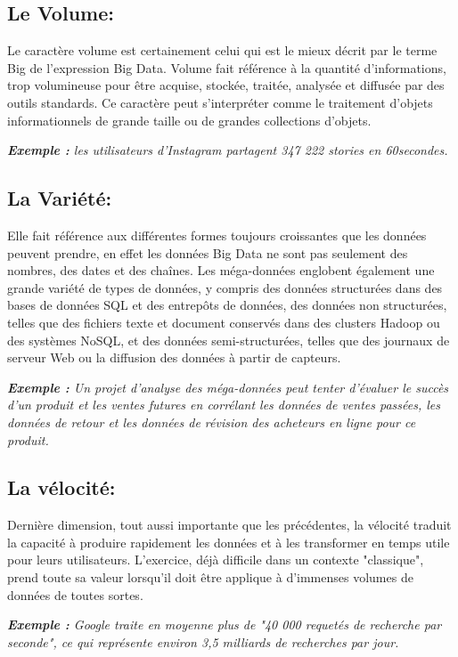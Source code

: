 \subsection{Le Volume:}
Le caractère volume est certainement celui qui est le mieux décrit par le terme Big de l'expression Big Data. Volume fait référence à la quantité d'informations, trop volumineuse pour être acquise, stockée, traitée, analysée et diffusée par des outils standards. Ce caractère peut s'interpréter comme le traitement d'objets informationnels de grande taille ou de grandes collections d'objets.

\textit{\textbf{Exemple :} les utilisateurs d'Instagram partagent 347 222 stories en 60secondes.}

\subsection{La Variété:}
Elle fait référence aux différentes formes toujours croissantes que les données peuvent prendre, en effet les données Big Data ne sont pas seulement des nombres, des dates et des chaînes. Les méga-données englobent également une grande variété de types de données, y compris des données structurées dans des bases de données SQL et des entrepôts de données, des données non structurées, telles que des fichiers texte et document conservés dans des clusters Hadoop ou des systèmes NoSQL, et des données semi-structurées, telles que des journaux de serveur Web ou la diffusion des données à partir de capteurs.

\textit{\textbf{Exemple :} Un projet d'analyse des méga-données peut tenter d'évaluer le succès d'un produit et les ventes futures en corrélant les données de ventes passées, les données de retour et les données de révision des acheteurs en ligne pour ce produit.}

\subsection{La vélocité:}
Dernière dimension, tout aussi importante que les précédentes, la vélocité traduit la capacité à produire rapidement les données et à les transformer en temps utile pour leurs utilisateurs. L'exercice, déjà difficile dans un contexte "classique", prend toute sa valeur lorsqu'il doit être applique à d'immenses volumes de données de toutes sortes.

\textit{\textbf{Exemple :} Google traite en moyenne plus de "40 000 requetés de recherche par seconde", ce qui représente environ 3,5 milliards de recherches par jour.}

